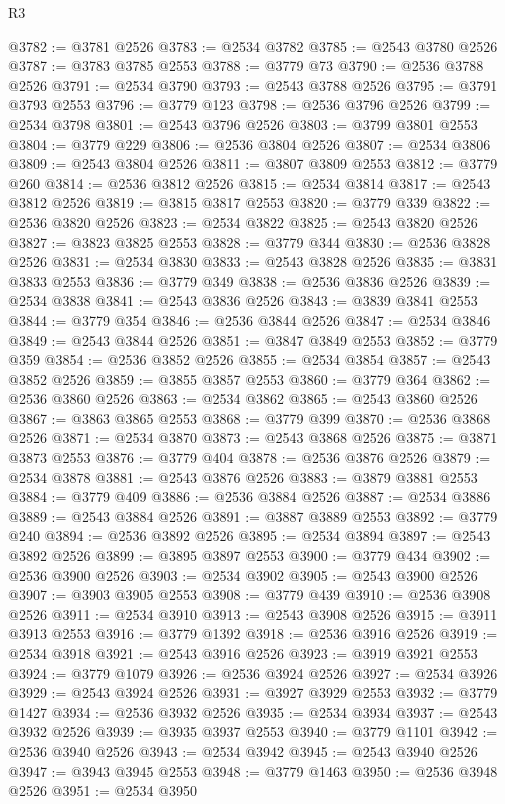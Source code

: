\begin{lexlean}{R3}
\begin{coremodule}
@3782 := @3781 @2526
@3783 := @2534 @3782
@3785 := @2543 @3780 @2526
@3787 := @3783 @3785 @2553
@3788 := @3779 @73
@3790 := @2536 @3788 @2526
@3791 := @2534 @3790
@3793 := @2543 @3788 @2526
@3795 := @3791 @3793 @2553
@3796 := @3779 @123
@3798 := @2536 @3796 @2526
@3799 := @2534 @3798
@3801 := @2543 @3796 @2526
@3803 := @3799 @3801 @2553
@3804 := @3779 @229
@3806 := @2536 @3804 @2526
@3807 := @2534 @3806
@3809 := @2543 @3804 @2526
@3811 := @3807 @3809 @2553
@3812 := @3779 @260
@3814 := @2536 @3812 @2526
@3815 := @2534 @3814
@3817 := @2543 @3812 @2526
@3819 := @3815 @3817 @2553
@3820 := @3779 @339
@3822 := @2536 @3820 @2526
@3823 := @2534 @3822
@3825 := @2543 @3820 @2526
@3827 := @3823 @3825 @2553
@3828 := @3779 @344
@3830 := @2536 @3828 @2526
@3831 := @2534 @3830
@3833 := @2543 @3828 @2526
@3835 := @3831 @3833 @2553
@3836 := @3779 @349
@3838 := @2536 @3836 @2526
@3839 := @2534 @3838
@3841 := @2543 @3836 @2526
@3843 := @3839 @3841 @2553
@3844 := @3779 @354
@3846 := @2536 @3844 @2526
@3847 := @2534 @3846
@3849 := @2543 @3844 @2526
@3851 := @3847 @3849 @2553
@3852 := @3779 @359
@3854 := @2536 @3852 @2526
@3855 := @2534 @3854
@3857 := @2543 @3852 @2526
@3859 := @3855 @3857 @2553
@3860 := @3779 @364
@3862 := @2536 @3860 @2526
@3863 := @2534 @3862
@3865 := @2543 @3860 @2526
@3867 := @3863 @3865 @2553
@3868 := @3779 @399
@3870 := @2536 @3868 @2526
@3871 := @2534 @3870
@3873 := @2543 @3868 @2526
@3875 := @3871 @3873 @2553
@3876 := @3779 @404
@3878 := @2536 @3876 @2526
@3879 := @2534 @3878
@3881 := @2543 @3876 @2526
@3883 := @3879 @3881 @2553
@3884 := @3779 @409
@3886 := @2536 @3884 @2526
@3887 := @2534 @3886
@3889 := @2543 @3884 @2526
@3891 := @3887 @3889 @2553
@3892 := @3779 @240
@3894 := @2536 @3892 @2526
@3895 := @2534 @3894
@3897 := @2543 @3892 @2526
@3899 := @3895 @3897 @2553
@3900 := @3779 @434
@3902 := @2536 @3900 @2526
@3903 := @2534 @3902
@3905 := @2543 @3900 @2526
@3907 := @3903 @3905 @2553
@3908 := @3779 @439
@3910 := @2536 @3908 @2526
@3911 := @2534 @3910
@3913 := @2543 @3908 @2526
@3915 := @3911 @3913 @2553
@3916 := @3779 @1392
@3918 := @2536 @3916 @2526
@3919 := @2534 @3918
@3921 := @2543 @3916 @2526
@3923 := @3919 @3921 @2553
@3924 := @3779 @1079
@3926 := @2536 @3924 @2526
@3927 := @2534 @3926
@3929 := @2543 @3924 @2526
@3931 := @3927 @3929 @2553
@3932 := @3779 @1427
@3934 := @2536 @3932 @2526
@3935 := @2534 @3934
@3937 := @2543 @3932 @2526
@3939 := @3935 @3937 @2553
@3940 := @3779 @1101
@3942 := @2536 @3940 @2526
@3943 := @2534 @3942
@3945 := @2543 @3940 @2526
@3947 := @3943 @3945 @2553
@3948 := @3779 @1463
@3950 := @2536 @3948 @2526
@3951 := @2534 @3950

\end{coremodule}
\end{lexlean}
